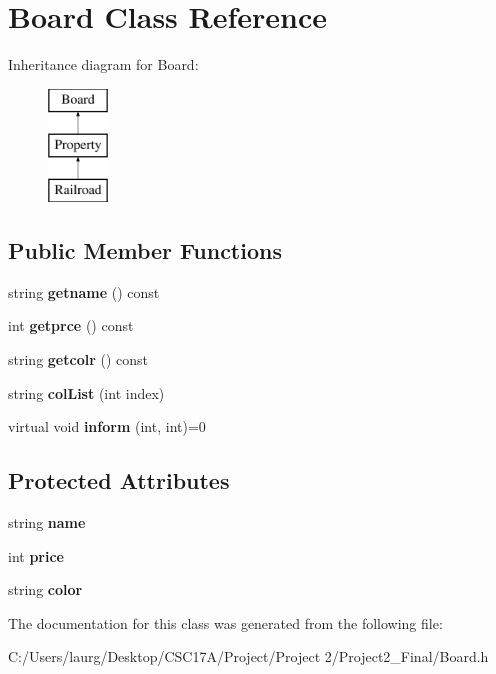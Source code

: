\hypertarget{class_board}{}\section{Board Class Reference}
\label{class_board}
Inheritance diagram for Board\+:\begin{figure}[H]
\begin{center}
\leavevmode
\includegraphics[height=3.000000cm]{class_board}
\end{center}
\end{figure}
\subsection*{Public Member Functions}
\begin{DoxyCompactItemize}
\item 
\mbox{\label{class_board_af13c117dfba2e7f010f3c53dae7dab3b}} 
string {\bfseries getname} () const
\item 
\mbox{\label{class_board_acd7fadc7efd5dff9a92083ac5505ba27}} 
int {\bfseries getprce} () const
\item 
\mbox{\label{class_board_a10f8fe6e8ba0a68f130da3efc8a40ab2}} 
string {\bfseries getcolr} () const
\item 
\mbox{\label{class_board_a274a3894ace6e7f0966ea1d4dd6aa459}} 
string {\bfseries col\+List} (int index)
\item 
\mbox{\label{class_board_a55e0bccf65171a6b283d1d8fa2c4d6af}} 
virtual void {\bfseries inform} (int, int)=0
\end{DoxyCompactItemize}
\subsection*{Protected Attributes}
\begin{DoxyCompactItemize}
\item 
\mbox{\label{class_board_a84224bba9f78a49a9d81b6ae00404b79}} 
string {\bfseries name}
\item 
\mbox{\label{class_board_aee61b2385e58ff70b14576c2269431fd}} 
int {\bfseries price}
\item 
\mbox{\label{class_board_ad90ef830d9ea1d089deca35ecac3e4ae}} 
string {\bfseries color}
\end{DoxyCompactItemize}


The documentation for this class was generated from the following file\+:\begin{DoxyCompactItemize}
\item 
C\+:/\+Users/laurg/\+Desktop/\+C\+S\+C17\+A/\+Project/\+Project 2/\+Project2\+\_\+\+Final/Board.\+h\end{DoxyCompactItemize}
